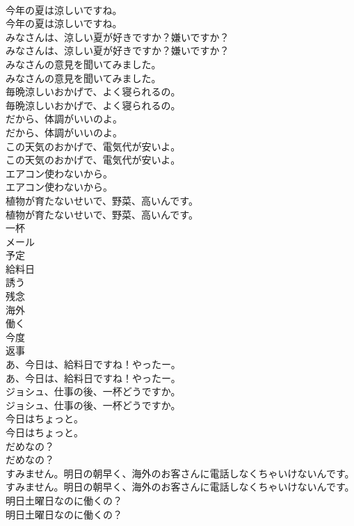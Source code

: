 \documentclass[8pt]{extreport}
\begin{document}
\begin{CJK}{UTF8}{min}
\\	今年の夏は涼しいですね。	
\\	今年の夏は涼しいですね。 
\\	みなさんは、涼しい夏が好きですか？嫌いですか？	
\\	みなさんは、涼しい夏が好きですか？嫌いですか？ 
\\	みなさんの意見を聞いてみました。	
\\	みなさんの意見を聞いてみました。 
\\	毎晩涼しいおかげで、よく寝られるの。	
\\	毎晩涼しいおかげで、よく寝られるの。 
\\	だから、体調がいいのよ。	
\\	だから、体調がいいのよ。 
\\	この天気のおかげで、電気代が安いよ。	
\\	この天気のおかげで、電気代が安いよ。 
\\	エアコン使わないから。	
\\	エアコン使わないから。 
\\	植物が育たないせいで、野菜、高いんです。	
\\	植物が育たないせいで、野菜、高いんです。 
\\	一杯
\\	メール
\\	予定
\\	給料日
\\	誘う
\\	残念
\\	海外
\\	働く
\\	今度
\\	返事
\\	あ、今日は、給料日ですね！やったー。	
\\	あ、今日は、給料日ですね！やったー。 
\\	ジョシュ、仕事の後、一杯どうですか。	
\\	ジョシュ、仕事の後、一杯どうですか。 
\\	今日はちょっと。	
\\	今日はちょっと。 
\\	だめなの？	
\\	だめなの？ 
\\	すみません。明日の朝早く、海外のお客さんに電話しなくちゃいけないんです。	
\\	すみません。明日の朝早く、海外のお客さんに電話しなくちゃいけないんです。 
\\	明日土曜日なのに働くの？	
\\	明日土曜日なのに働くの？ 

\end{CJK}
\end{document}
